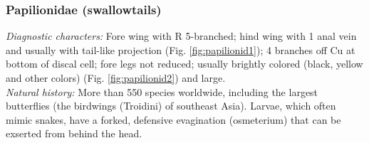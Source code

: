 \documentclass[letterpaper, 11pt]{article}
\begin{document}
\subsubsection{Papilionidae (swallowtails)}
\noindent{}\textit{Diagnostic characters:} Fore wing with R 5-branched; hind wing with 1 anal vein and usually with tail-like projection (Fig. \ref{fig:papilionid1}); 4 branches off Cu at bottom of discal cell; fore legs not reduced; usually brightly colored (black, yellow and other colors) (Fig. \ref{fig:papilionid2}) and large.\\

\noindent{}\textit{Natural history:} More than 550 species worldwide, including the largest butterflies (the birdwings (Troidini) of southeast Asia). Larvae, which often mimic snakes, have a forked, defensive evagination (osmeterium) that can be exserted from behind the head.
\end{document}
